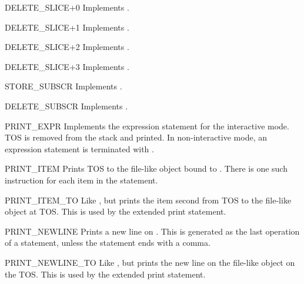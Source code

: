 \begin{opcodedesc}{DELETE_SLICE+0}{}
Implements .
\end{opcodedesc}

\begin{opcodedesc}{DELETE_SLICE+1}{}
Implements .
\end{opcodedesc}

\begin{opcodedesc}{DELETE_SLICE+2}{}
Implements .
\end{opcodedesc}

\begin{opcodedesc}{DELETE_SLICE+3}{}
Implements .
\end{opcodedesc}

\begin{opcodedesc}{STORE_SUBSCR}{}
Implements .
\end{opcodedesc}

\begin{opcodedesc}{DELETE_SUBSCR}{}
Implements .
\end{opcodedesc}

\begin{opcodedesc}{PRINT_EXPR}{}
Implements the expression statement for the interactive mode.  TOS is
removed from the stack and printed.  In non-interactive mode, an
expression statement is terminated with .
\end{opcodedesc}

\begin{opcodedesc}{PRINT_ITEM}{}
Prints TOS to the file-like object bound to .  There
is one such instruction for each item in the  statement.
\end{opcodedesc}

\begin{opcodedesc}{PRINT_ITEM_TO}{}
Like , but prints the item second from TOS to the
file-like object at TOS.  This is used by the extended print statement.
\end{opcodedesc}

\begin{opcodedesc}{PRINT_NEWLINE}{}
Prints a new line on .  This is generated as the
last operation of a  statement, unless the statement
ends with a comma.
\end{opcodedesc}

\begin{opcodedesc}{PRINT_NEWLINE_TO}{}
Like , but prints the new line on the file-like
object on the TOS.  This is used by the extended print statement.
\end{opcodedesc}

